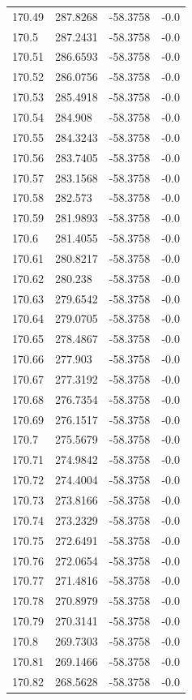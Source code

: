 \begin{table}[H]
\begin{tabular}{llll}
170.49 & 287.8268 & -58.3758 & -0.0 \\
170.5 & 287.2431 & -58.3758 & -0.0 \\
170.51 & 286.6593 & -58.3758 & -0.0 \\
170.52 & 286.0756 & -58.3758 & -0.0 \\
170.53 & 285.4918 & -58.3758 & -0.0 \\
170.54 & 284.908 & -58.3758 & -0.0 \\
170.55 & 284.3243 & -58.3758 & -0.0 \\
170.56 & 283.7405 & -58.3758 & -0.0 \\
170.57 & 283.1568 & -58.3758 & -0.0 \\
170.58 & 282.573 & -58.3758 & -0.0 \\
170.59 & 281.9893 & -58.3758 & -0.0 \\
170.6 & 281.4055 & -58.3758 & -0.0 \\
170.61 & 280.8217 & -58.3758 & -0.0 \\
170.62 & 280.238 & -58.3758 & -0.0 \\
170.63 & 279.6542 & -58.3758 & -0.0 \\
170.64 & 279.0705 & -58.3758 & -0.0 \\
170.65 & 278.4867 & -58.3758 & -0.0 \\
170.66 & 277.903 & -58.3758 & -0.0 \\
170.67 & 277.3192 & -58.3758 & -0.0 \\
170.68 & 276.7354 & -58.3758 & -0.0 \\
170.69 & 276.1517 & -58.3758 & -0.0 \\
170.7 & 275.5679 & -58.3758 & -0.0 \\
170.71 & 274.9842 & -58.3758 & -0.0 \\
170.72 & 274.4004 & -58.3758 & -0.0 \\
170.73 & 273.8166 & -58.3758 & -0.0 \\
170.74 & 273.2329 & -58.3758 & -0.0 \\
170.75 & 272.6491 & -58.3758 & -0.0 \\
170.76 & 272.0654 & -58.3758 & -0.0 \\
170.77 & 271.4816 & -58.3758 & -0.0 \\
170.78 & 270.8979 & -58.3758 & -0.0 \\
170.79 & 270.3141 & -58.3758 & -0.0 \\
170.8 & 269.7303 & -58.3758 & -0.0 \\
170.81 & 269.1466 & -58.3758 & -0.0 \\
170.82 & 268.5628 & -58.3758 & -0.0 \\

\end{tabular}
\end{table}
